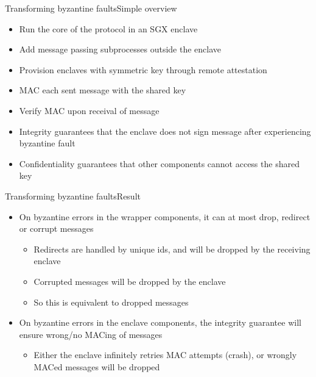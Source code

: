 \documentclass{beamer}
\begin{document}
\begin{frame}{Transforming byzantine faults}{Simple overview}
	\begin{itemize}
		\item Run the core of the protocol in an SGX enclave

  	\vfill

		\item Add message passing subprocesses outside the enclave

  	\vfill

		\item Provision enclaves with symmetric key through remote attestation

  	\vfill

		\item MAC each sent message with the shared key

  	\vfill

		\item Verify MAC upon receival of message

  	\vfill

		\item Integrity guarantees that the enclave does not sign message after experiencing byzantine fault

  	\vfill

  	\item Confidentiality guarantees that other components cannot access the shared key

	\end{itemize}
\end{frame}

\begin{frame}{Transforming byzantine faults}{Result}
	\begin{itemize}
		\item On byzantine errors in the wrapper components, it can at most drop, redirect or corrupt messages
		\begin{itemize}
			\item Redirects are handled by unique ids, and will be dropped by the receiving enclave
			\item Corrupted messages will be dropped by the enclave
			\item So this is equivalent to dropped messages
		\end{itemize}

	\vfill

		\item On byzantine errors in the enclave components, the integrity guarantee will ensure wrong/no MACing of messages
		\begin{itemize}
			\item Either the enclave infinitely retries MAC attempts (crash), or wrongly MACed messages will be dropped
		\end{itemize}
	\end{itemize}
\end{frame}
\end{document}
